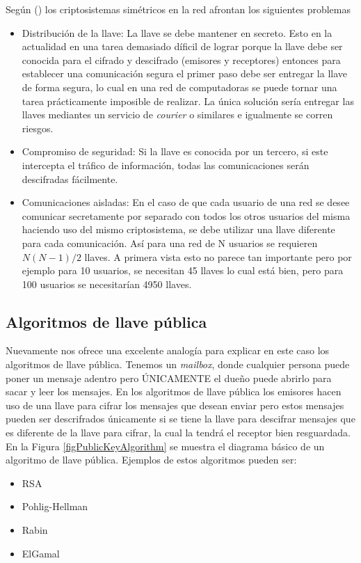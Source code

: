 Según (\cite{bruce}) los criptosistemas simétricos en la red afrontan los siguientes problemas
\begin{itemize}
\item Distribución de la llave: La llave se debe mantener en secreto. Esto en la actualidad en una tarea demasiado díficil de lograr porque la llave debe ser conocida para el cifrado y descifrado (emisores y receptores) entonces para establecer una comunicación segura el primer paso debe ser entregar la llave de forma segura, lo cual en una red de computadoras se puede tornar una tarea prácticamente imposible de realizar. La única solución sería entregar las llaves mediantes un servicio de \textit{courier} o similares e igualmente se corren riesgos. 

\item Compromiso de seguridad: Si la llave es conocida por un tercero, si este intercepta el tráfico de información, todas las comunicaciones serán descifradas fácilmente.

\item Comunicaciones aisladas: En el caso de que cada usuario de una red se desee comunicar secretamente por separado con todos los otros usuarios del misma haciendo uso del mismo criptosistema, se debe utilizar una llave diferente para cada comunicación. Así para una red de N usuarios se requieren $N(N - 1)/2$ llaves. A primera vista esto no parece tan importante pero por ejemplo para 10 usuarios, se necesitan 45 llaves lo cual está bien, pero para 100 usuarios se necesitarían 4950 llaves.
\end{itemize}



\subsection{Algoritmos de llave pública}
Nuevamente \cite{bruce} nos ofrece una excelente analogía para explicar en este caso los algoritmos de llave pública. Tenemos un \textit{mailbox}, donde cualquier persona puede poner un mensaje adentro pero ÚNICAMENTE el dueño puede abrirlo para sacar y leer los mensajes.
\newline
\newline
En los algoritmos de llave pública los emisores hacen uso de una llave para cifrar los mensajes que desean enviar pero estos mensajes pueden ser descrifrados únicamente si se tiene la llave para descifrar mensajes que es diferente de la llave para cifrar, la cual la tendrá el receptor bien resguardada. En la Figura \ref{figPublicKeyAlgorithm} se muestra el diagrama básico de un algoritmo de llave pública. Ejemplos de estos algoritmos pueden ser:
\begin{itemize}
\item RSA
\item Pohlig-Hellman
\item Rabin
\item ElGamal
\end{itemize}

